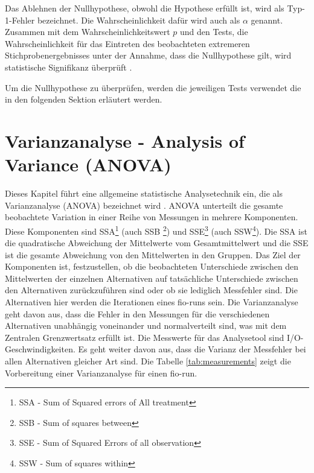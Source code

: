 Das Ablehnen der Nullhypothese, obwohl die Hypothese erfüllt ist, wird als Typ-1-Fehler bezeichnet.
Die Wahrscheinlichkeit dafür wird auch als $\alpha$ genannt. Zusammen mit dem Wahrscheinlichkeitswert $p$ und den Tests, 
 die Wahrscheinlichkeit für das Eintreten des beobachteten 
extremeren Stichprobenergebnisses unter der Annahme, dass die Nullhypothese gilt, wird statistische Signifikanz überprüft \cite{kurt2020stochastik}.


Um die Nullhypothese zu überprüfen, werden die jeweiligen Tests verwendet die in den folgenden Sektion erläutert werden. 

\section{Varianzanalyse - Analysis of Variance (ANOVA)}
 
Dieses Kapitel führt eine allgemeine statistische Analysetechnik ein, die als Varianzanalyse (ANOVA) bezeichnet wird \cite{Lilja_2000}. 
ANOVA unterteilt die gesamte beobachtete Variation in einer Reihe von Messungen in mehrere Komponenten.
Diese Komponenten sind SSA\footnote{SSA - Sum of Squared errors of All treatment} (auch SSB \footnote{SSB - Sum of squares between}) und SSE\footnote{SSE - Sum of Squared Errors of all observation}
 (auch SSW\footnote{SSW - Sum of squares within}).
Die SSA  ist die quadratische Abweichung der Mittelwerte vom Gesamtmittelwert und die SSE
ist die gesamte Abweichung von den Mittelwerten in den Gruppen.
Das Ziel der Komponenten ist, festzustellen, ob die beobachteten Unterschiede zwischen den Mittelwerten der einzelnen Alternativen auf tatsächliche 
Unterschiede zwischen den Alternativen zurückzuführen sind oder ob sie lediglich Messfehler sind.
Die Alternativen hier werden die Iterationen eines fio-runs sein.
Die Varianzanalyse geht davon aus, dass die Fehler in den Messungen für die verschiedenen Alternativen
unabhängig voneinander und normalverteilt sind, was mit dem Zentralen Grenzwertsatz erfüllt ist.
Die Messwerte für das Analysetool sind I/O-Geschwindigkeiten.
Es geht weiter davon aus, dass die Varianz der Messfehler bei allen Alternativen gleicher Art sind.
Die Tabelle \ref{tab:measurements} zeigt die Vorbereitung einer Varianzanalyse für einen fio-run.

